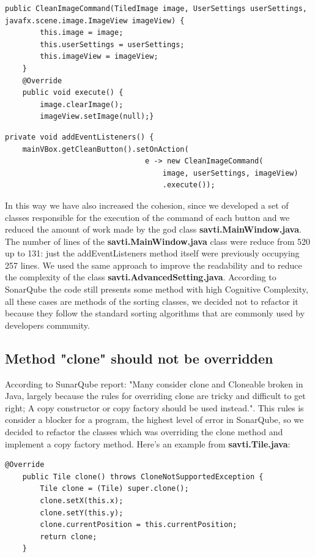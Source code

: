 \documentclass{article}
\begin{document}
\begin{lstlisting}[caption={Command},captionpos=b]
public CleanImageCommand(TiledImage image, UserSettings userSettings, javafx.scene.image.ImageView imageView) {
        this.image = image;
        this.userSettings = userSettings;
        this.imageView = imageView;
    }
    @Override
    public void execute() {
        image.clearImage();
        imageView.setImage(null);}
\end{lstlisting}


\begin{lstlisting}[caption={Client},captionpos =b]
 private void addEventListeners() {
    mainVBox.getCleanButton().setOnAction(
                                e -> new CleanImageCommand(
                                    image, userSettings, imageView)
                                    .execute());
\end{lstlisting}
In this way we have also increased the cohesion, since we developed a set of classes responsible for the execution of the command of each button and we reduced the amount of work made by the god class \textbf{savti.MainWindow.java}.
The number of lines of the \textbf{savti.MainWindow.java} class were reduce from 520 up to 131: just the addEventListeners method itself were previously occupying 257 lines.
We used the same approach to improve the readability and to reduce the complexity of the class \textbf{savti.AdvancedSetting.java}. According to SonarQube the code still presents some method with high Cognitive Complexity, all these cases are methods of the sorting classes, we decided not to refactor it because they follow the standard sorting algorithms that are commonly used by developers community.
\\

\subsection{Method "clone" should not be overridden}
According to SunarQube report: "Many consider clone and Cloneable broken in Java, largely because the rules for overriding clone are tricky and difficult to get right; A copy constructor or copy factory should be used instead.". This rules is consider a blocker for a program, the highest level of error in SonarQube, so we decided to refactor the classes which was overriding the clone method and implement a copy factory method. Here's an example from \textbf{savti.Tile.java}:

    \begin{lstlisting}[caption={First clone implementation},captionpos =b]
    @Override
    public Tile clone() throws CloneNotSupportedException {
        Tile clone = (Tile) super.clone();
        clone.setX(this.x);
        clone.setY(this.y);
        clone.currentPosition = this.currentPosition;
        return clone;
    }
    \end{lstlisting}
    
\end{document}
